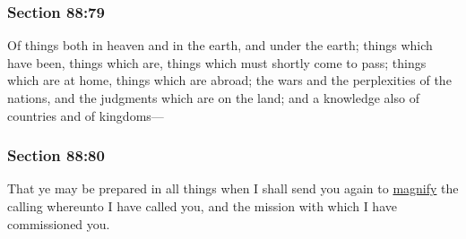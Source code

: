 
	\subsubsection{Section 88:79} %
		\label{DC88-79}

		Of things both in heaven and in the earth, and under the earth; things which have been, things which are, things which must shortly come to pass; things which are at home, things which are abroad; the wars and the perplexities of the nations, and the judgments which are on the land; and a knowledge also of countries and of kingdoms---


	\subsubsection{Section 88:80} %
		\label{DC88-80}

		That ye may be prepared in all things when I shall send you again to \hyperref[MAGNIFY]{magnify} the calling whereunto I have called you, and the mission with which I have commissioned you.


